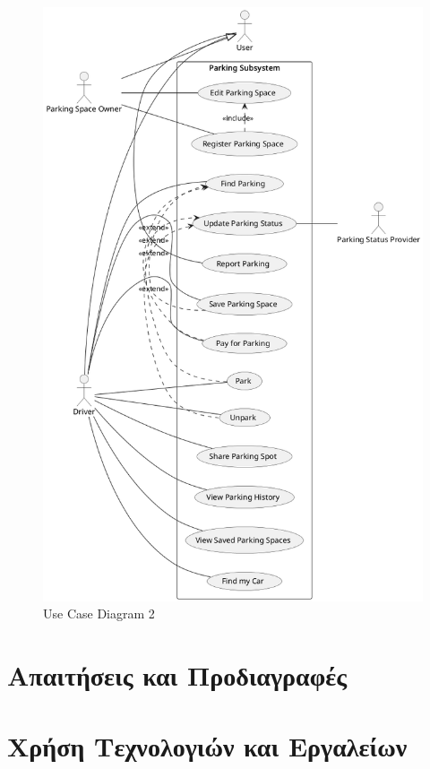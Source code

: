 \documentclass[11pt]{article}
\begin{document}
\begin{figure}
    \centering
    \includegraphics[width=\textwidth]{use-cases-parking}
    \caption{Use Case Diagram 2}
\end{figure}

\section{Απαιτήσεις και Προδιαγραφές}

\section{Χρήση Τεχνολογιών και Εργαλείων}
\end{document}
